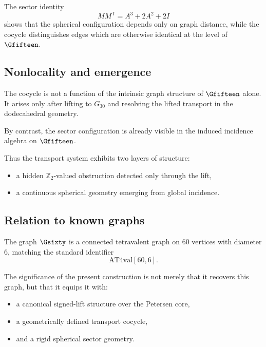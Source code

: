 The sector identity
\[
MM^{\mathsf T} = A^3 + 2A^2 + 2I
\]
shows that the spherical configuration depends only on graph distance,
while the cocycle distinguishes edges which are otherwise identical at
the level of $\Gfifteen$.

\subsection{Nonlocality and emergence}

The cocycle is not a function of the intrinsic graph structure of
$\Gfifteen$ alone. It arises only after lifting to $G_{30}$ and resolving
the lifted transport in the dodecahedral geometry.

By contrast, the sector configuration is already visible in the induced
incidence algebra on $\Gfifteen$.

Thus the transport system exhibits two layers of structure:
\begin{itemize}
\item a hidden $\mathbb{Z}_2$-valued obstruction detected only through
the lift,
\item a continuous spherical geometry emerging from global incidence.
\end{itemize}

\subsection{Relation to known graphs}

The graph $\Gsixty$ is a connected tetravalent graph on $60$ vertices
with diameter $6$, matching the standard identifier
\[
\mathrm{AT4val}[60,6].
\]

The significance of the present construction is not merely that it
recovers this graph, but that it equips it with:
\begin{itemize}
\item a canonical signed-lift structure over the Petersen core,
\item a geometrically defined transport cocycle,
\item and a rigid spherical sector geometry.
\end{itemize}
